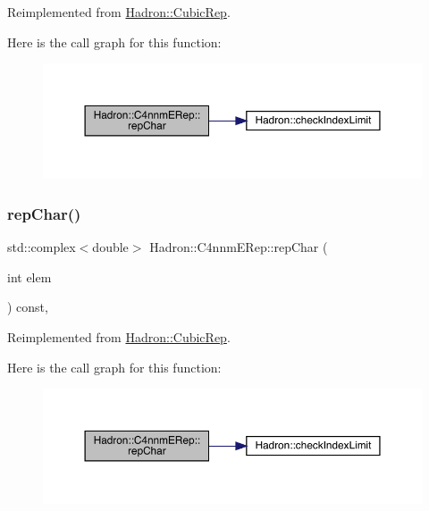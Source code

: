 Reimplemented from \mbox{\hyperlink{structHadron_1_1CubicRep_af45227106e8e715e84b0af69cd3b36f8}{Hadron\+::\+Cubic\+Rep}}.

Here is the call graph for this function\+:
\nopagebreak
\begin{figure}[H]
\begin{center}
\leavevmode
\includegraphics[width=350pt]{dc/d30/structHadron_1_1C4nnmERep_af3cb7f743630f5a14e38a10ee61dc9ff_cgraph}
\end{center}
\end{figure}
\mbox{\label{structHadron_1_1C4nnmERep_af3cb7f743630f5a14e38a10ee61dc9ff}} 
\subsubsection{\texorpdfstring{repChar()}{repChar()}\hspace{0.1cm}{\footnotesize\ttfamily [3/3]}}
{\footnotesize\ttfamily std\+::complex$<$double$>$ Hadron\+::\+C4nnm\+E\+Rep\+::rep\+Char (\begin{DoxyParamCaption}\item[{int}]{elem }\end{DoxyParamCaption}) const\hspace{0.3cm}{\ttfamily [inline]}, {\ttfamily [virtual]}}



Reimplemented from \mbox{\hyperlink{structHadron_1_1CubicRep_af45227106e8e715e84b0af69cd3b36f8}{Hadron\+::\+Cubic\+Rep}}.

Here is the call graph for this function\+:
\nopagebreak
\begin{figure}[H]
\begin{center}
\leavevmode
\includegraphics[width=350pt]{dc/d30/structHadron_1_1C4nnmERep_af3cb7f743630f5a14e38a10ee61dc9ff_cgraph}
\end{center}
\end{figure}
\mbox{\label{structHadron_1_1C4nnmERep_adb5804895fb825dd5a5fde9c417e5cb8}} 
